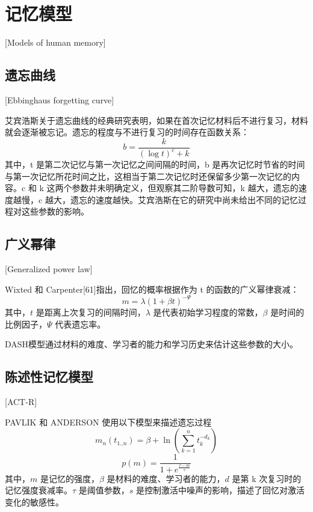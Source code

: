 \section{记忆模型}[Models of human memory]

\subsection{遗忘曲线}[Ebbinghaus forgetting curve]

艾宾浩斯关于遗忘曲线的经典研究表明，如果在首次记忆材料后不进行复习，材料就会逐渐被忘记。遗忘的程度与不进行复习的时间存在函数关系：
\begin{equation}
b = \frac{k}{(\log t)^c + k}
\end{equation}
其中，t 是第二次记忆与第一次记忆之间间隔的时间，b 是再次记忆时节省的时间与第一次记忆所花时间之比，这相当于第二次记忆时还保留多少第一次记忆的内容。c 和 k 这两个参数并未明确定义，但观察其二阶导数可知，k 越大，遗忘的速度越慢，c 越大，遗忘的速度越快。艾宾浩斯在它的研究中尚未给出不同的记忆过程对这些参数的影响。

\subsection{广义幂律}[Generalized power law]

Wixted 和 Carpenter[61]指出，回忆的概率根据作为 t 的函数的广义幂律衰减：
\begin{equation}
m=\lambda(1+\beta t)^{-\Psi}
\end{equation}
其中，$t$ 是距离上次复习的间隔时间，$\lambda$ 是代表初始学习程度的常数，$\beta$ 是时间的比例因子，$\Psi$ 代表遗忘率。

DASH模型通过材料的难度、学习者的能力和学习历史来估计这些参数的大小。

\subsection{陈述性记忆模型}[ACT-R]

PAVLIK 和 ANDERSON 使用以下模型来描述遗忘过程
\begin{equation}
m_n(t_{1..n}) = \beta + \ln(\sum\limits_{k=1}^n t_k^{-d_k})
\end{equation}
\begin{equation}
p(m) = \frac{1}{1+e^{\frac{\tau-m}{s}}}
\end{equation}
其中，$m$ 是记忆的强度，$\beta$ 是材料的难度、学习者的能力，$d$ 是第 k 次复习时的记忆强度衰减率。$\tau$ 是阈值参数，$s$ 是控制激活中噪声的影响，描述了回忆对激活变化的敏感性。

